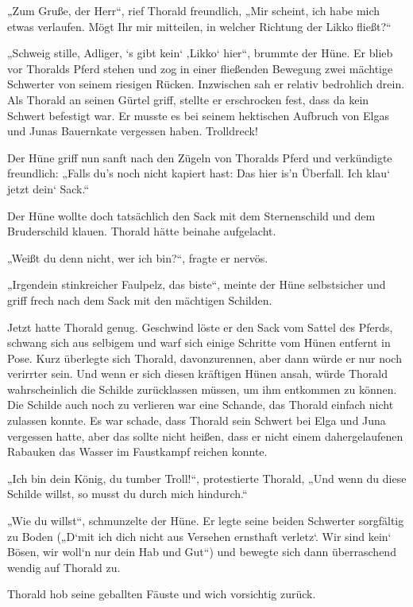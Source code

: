 „Zum Gruße, der Herr“, rief Thorald freundlich, „Mir scheint, ich habe mich etwas verlaufen. Mögt Ihr mir mitteilen, in welcher Richtung der Likko fließt?“

„Schweig stille, Adliger, ‘s gibt kein‘ ‚Likko‘ hier“, brummte der Hüne. Er blieb vor Thoralds Pferd stehen und zog in einer fließenden Bewegung zwei mächtige Schwerter von seinem riesigen Rücken. Inzwischen sah er relativ bedrohlich drein. Als Thorald an seinen Gürtel griff, stellte er erschrocken fest, dass da kein Schwert befestigt war. Er musste es bei seinem hektischen Aufbruch von Elgas und Junas Bauernkate vergessen haben. Trolldreck!

Der Hüne griff nun sanft nach den Zügeln von Thoralds Pferd und verkündigte freundlich: „Falls du’s noch nicht kapiert hast: Das hier is’n Überfall. Ich klau‘ jetzt dein‘ Sack.“

Der Hüne wollte doch tatsächlich den Sack mit dem Sternenschild und dem Bruderschild klauen. Thorald hätte beinahe aufgelacht.

„Weißt du denn nicht, wer ich bin?“, fragte er nervös.

„Irgendein stinkreicher Faulpelz, das biste“, meinte der Hüne selbstsicher und griff frech nach dem Sack mit den mächtigen Schilden.

Jetzt hatte Thorald genug. Geschwind löste er den Sack vom Sattel des Pferds, schwang sich aus selbigem und warf sich einige Schritte vom Hünen entfernt in Pose. Kurz überlegte sich Thorald, davonzurennen, aber dann würde er nur noch verirrter sein. Und wenn er sich diesen kräftigen Hünen ansah, würde Thorald wahrscheinlich die Schilde zurücklassen müssen, um ihm entkommen zu können. Die Schilde auch noch zu verlieren war eine Schande, das Thorald einfach nicht zulassen konnte. Es war schade, dass Thorald sein Schwert bei Elga und Juna vergessen hatte, aber das sollte nicht heißen, dass er nicht einem dahergelaufenen Rabauken das Wasser im Faustkampf reichen konnte.

„Ich bin dein König, du tumber Troll!“, protestierte Thorald, „Und wenn du diese Schilde willst, so musst du durch mich hindurch.“

„Wie du willst“, schmunzelte der Hüne. Er legte seine beiden Schwerter sorgfältig zu Boden („D‘mit ich dich nicht aus Versehen ernsthaft verletz‘. Wir sind kein‘ Bösen, wir woll‘n nur dein Hab und Gut“) und bewegte sich dann überraschend wendig auf Thorald zu.

Thorald hob seine geballten Fäuste und wich vorsichtig zurück.

